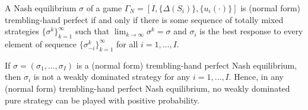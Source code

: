 \begin{prop}
    A Nash equilibrium $\sigma$ of a game $\Gamma_N = [I, \{\Delta(S_i)\}, \{u_i(\cdot)\}]$ is (normal form) trembling-hand perfect if and only if there is some sequence of totally mixed strategies $\{\sigma^k\}_{k = 1}^\infty$ such that $\lim_{k \rightarrow \infty} \sigma^k = \sigma$ and $\sigma_i$ is the best response to every element of sequence $\{\sigma_{-i}^k\}_{k = 1}^\infty$ for all $i = 1, \dots, I$.
\end{prop}

\begin{prop}
    If $\sigma = (\sigma_1, \dots, \sigma_I)$ is a (normal form) trembling-hand perfect Nash equilibrium, then $\sigma_i$ is not a weakly dominated strategy for any $i = 1, \dots, I$. Hence, in any (normal form) trembling-hand perfect Nash equilibrium, no weakly dominated pure strategy can be played with positive probability.
\end{prop}

